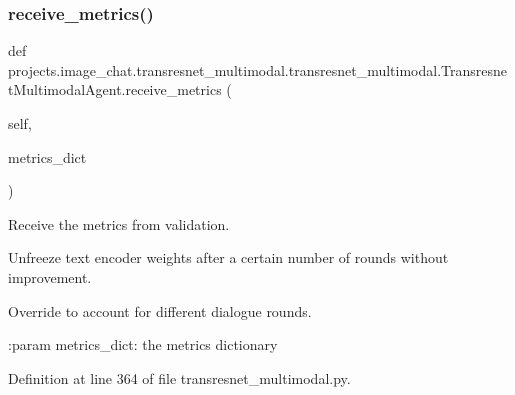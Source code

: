 \subsubsection{\texorpdfstring{receive\+\_\+metrics()}{receive\_metrics()}}
{\footnotesize\ttfamily def projects.\+image\+\_\+chat.\+transresnet\+\_\+multimodal.\+transresnet\+\_\+multimodal.\+Transresnet\+Multimodal\+Agent.\+receive\+\_\+metrics (\begin{DoxyParamCaption}\item[{}]{self,  }\item[{}]{metrics\+\_\+dict }\end{DoxyParamCaption})}

\begin{DoxyVerb}Receive the metrics from validation.

Unfreeze text encoder weights after a certain number of rounds without improvement.

Override to account for different dialogue rounds.

:param metrics_dict:
    the metrics dictionary
\end{DoxyVerb}
 

Definition at line 364 of file transresnet\+\_\+multimodal.\+py.


